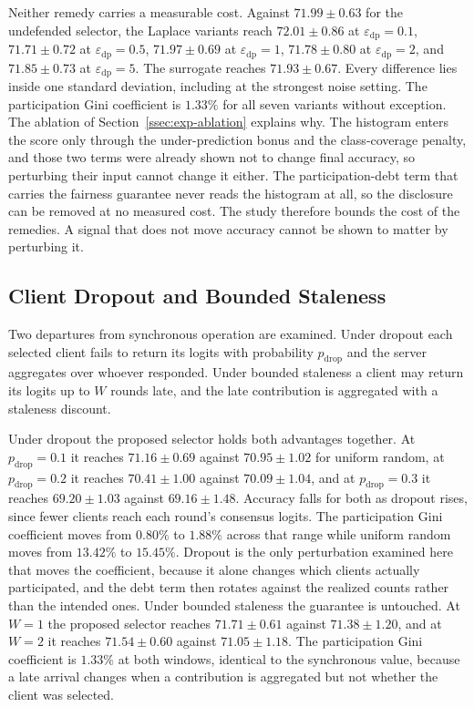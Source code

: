 \documentclass[journal]{IEEEtran}
\newcommand{\rev}[1]{#1}
\begin{document}
\rev{Neither remedy carries a measurable cost. Against $71.99 \pm 0.63$ for the undefended selector, the Laplace variants reach $72.01 \pm 0.86$ at $\varepsilon_{\mathrm{dp}} = 0.1$, $71.71 \pm 0.72$ at $\varepsilon_{\mathrm{dp}} = 0.5$, $71.97 \pm 0.69$ at $\varepsilon_{\mathrm{dp}} = 1$, $71.78 \pm 0.80$ at $\varepsilon_{\mathrm{dp}} = 2$, and $71.85 \pm 0.73$ at $\varepsilon_{\mathrm{dp}} = 5$. The surrogate reaches $71.93 \pm 0.67$. Every difference lies inside one standard deviation, including at the strongest noise setting. The participation Gini coefficient is $1.33\%$ for all seven variants without exception. The ablation of Section~\ref{ssec:exp-ablation} explains why. The histogram enters the score only through the under-prediction bonus and the class-coverage penalty, and those two terms were already shown not to change final accuracy, so perturbing their input cannot change it either. The participation-debt term that carries the fairness guarantee never reads the histogram at all, so the disclosure can be removed at no measured cost. The study therefore bounds the cost of the remedies. A signal that does not move accuracy cannot be shown to matter by perturbing it.}

\subsection{Client Dropout and Bounded Staleness}
\label{ssec:exp-dropout}

\rev{Two departures from synchronous operation are examined. Under dropout each selected client fails to return its logits with probability $p_{\text{drop}}$ and the server aggregates over whoever responded. Under bounded staleness a client may return its logits up to $W$ rounds late, and the late contribution is aggregated with a staleness discount.}

\rev{Under dropout the proposed selector holds both advantages together. At $p_{\text{drop}} = 0.1$ it reaches $71.16 \pm 0.69$ against $70.95 \pm 1.02$ for uniform random, at $p_{\text{drop}} = 0.2$ it reaches $70.41 \pm 1.00$ against $70.09 \pm 1.04$, and at $p_{\text{drop}} = 0.3$ it reaches $69.20 \pm 1.03$ against $69.16 \pm 1.48$. Accuracy falls for both as dropout rises, since fewer clients reach each round's consensus logits. The participation Gini coefficient moves from $0.80\%$ to $1.88\%$ across that range while uniform random moves from $13.42\%$ to $15.45\%$. Dropout is the only perturbation examined here that moves the coefficient, because it alone changes which clients actually participated, and the debt term then rotates against the realized counts rather than the intended ones. Under bounded staleness the guarantee is untouched. At $W = 1$ the proposed selector reaches $71.71 \pm 0.61$ against $71.38 \pm 1.20$, and at $W = 2$ it reaches $71.54 \pm 0.60$ against $71.05 \pm 1.18$. The participation Gini coefficient is $1.33\%$ at both windows, identical to the synchronous value, because a late arrival changes when a contribution is aggregated but not whether the client was selected.}
\end{document}
